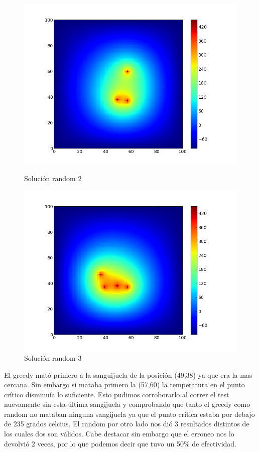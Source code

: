 \begin{figure}[htb]
\begin{center}
\includegraphics[scale=0.40]{imagenes/test6_random_2.png} 
\caption{Solución random 2} 
        \end{center}
\endminipage\hfill 
{}
\begin{center}
\includegraphics[scale=0.40]{imagenes/test6_random_3.png} 
\caption{Solución random 3} 
        \end{center}
\endminipage\hfill 
\end{figure}


El greedy mató primero a la sanguijuela de la posición (49,38) ya que era la mas cercana. Sin embargo si mataba primero la (57,60) la temperatura en el punto crítico disminuía lo suficiente. Esto pudimos corroborarlo al correr el test nuevamente sin esta última sangijuela y comprobando que tanto el greedy como random no mataban ninguna sangijuela ya que el punto crítica estaba por debajo de 235 grados celcius.
El random por otro lado nos dió 3 resultados distintos de los cuales dos son válidos. Cabe destacar sin embargo que el erroneo nos lo devolvió 2 veces, por lo que podemos decir que tuvo un 50\% de efectividad. 

